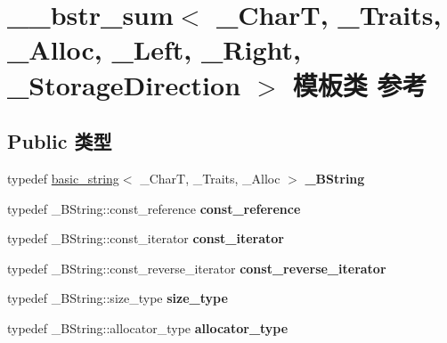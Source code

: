 \hypertarget{class____bstr__sum}{}\section{\+\_\+\+\_\+bstr\+\_\+sum$<$ \+\_\+\+CharT, \+\_\+\+Traits, \+\_\+\+Alloc, \+\_\+\+Left, \+\_\+\+Right, \+\_\+\+Storage\+Direction $>$ 模板类 参考}
\label{class____bstr__sum}
\subsection*{Public 类型}
\begin{DoxyCompactItemize}
\item 
\mbox{\label{class____bstr__sum_a7643689bdb529bf57c9b8dc66eca0d32}} 
typedef \hyperlink{classbasic__string}{basic\+\_\+string}$<$ \+\_\+\+CharT, \+\_\+\+Traits, \+\_\+\+Alloc $>$ {\bfseries \+\_\+\+B\+String}
\item 
\mbox{\label{class____bstr__sum_a7af5d425ab832f174f84873863677981}} 
typedef \+\_\+\+B\+String\+::const\+\_\+reference {\bfseries const\+\_\+reference}
\item 
\mbox{\label{class____bstr__sum_a7a43d62632dd00483b34d7446ca3e865}} 
typedef \+\_\+\+B\+String\+::const\+\_\+iterator {\bfseries const\+\_\+iterator}
\item 
\mbox{\label{class____bstr__sum_ad20e9182d072f13820ede8bee27dc289}} 
typedef \+\_\+\+B\+String\+::const\+\_\+reverse\+\_\+iterator {\bfseries const\+\_\+reverse\+\_\+iterator}
\item 
\mbox{\label{class____bstr__sum_a8636ac34be17588df6b32715022ab97e}} 
typedef \+\_\+\+B\+String\+::size\+\_\+type {\bfseries size\+\_\+type}
\item 
\mbox{\label{class____bstr__sum_a57997e442c487265a6fc95b335a12756}} 
typedef \+\_\+\+B\+String\+::allocator\+\_\+type {\bfseries allocator\+\_\+type}
\item 

\end{DoxyCompactItemize}
